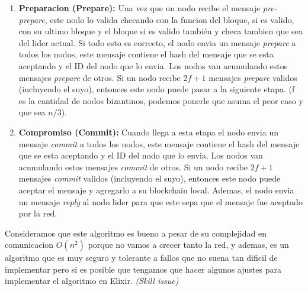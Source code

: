 {{\begin{enumerate}
        \item \textbf{Preparacion (Prepare):} Una vez que un nodo recibe el mensaje \textit{pre-prepare}, este nodo lo valida checando con la funcion del bloque, si es valido, con su ultimo bloque y el bloque si es valido también y checa tambien que sea del lider actual. Si todo esto es correcto, el nodo envia un mensaje \textit{prepare} a todos los nodos, este mensaje contiene el hash del mensaje que se esta aceptando y el ID del nodo que lo envia. Los nodos van acumulando estos mensajes \textit{prepare} de otros. Si un nodo recibe $2f+1$ mensajes \textit{prepare} validos (incluyendo el suyo), entonces este nodo puede pasar a la siguiente etapa. (f es la cantidad de nodos bizantinos, podemos ponerle que asuma el peor caso y que sea $n/3$).
        
        \item \textbf{Compromiso (Commit):} Cuando llega a esta etapa el nodo envia un mensaje \textit{commit} a todos los nodos, este mensaje contiene el hash del mensaje que se esta aceptando y el ID del nodo que lo envia. Los nodos van acumulando estos mensajes \textit{commit} de otros. Si un nodo recibe $2f+1$ mensajes \textit{commit} validos (incluyendo el suyo), entonces este nodo puede aceptar el mensaje y agregarlo a su blockchain local. Ademas, el nodo envia un mensaje \textit{reply} al nodo lider para que este sepa que el mensaje fue aceptado por la red.
    \end{enumerate}

    Consideramos que este algoritmo es bueno a pesar de su complejidad en comunicacion $O(n^2)$ porque no vamos a crecer tanto la red, y ademas, es un algoritmo que es muy seguro y tolerante a fallos que no suena tan dificil de implementar pero si es posible que tengamos que hacer algunos ajustes para implementar el algoritmo en Elixir. \textit{(Skill issue)} \vspace{0.3cm}
}}